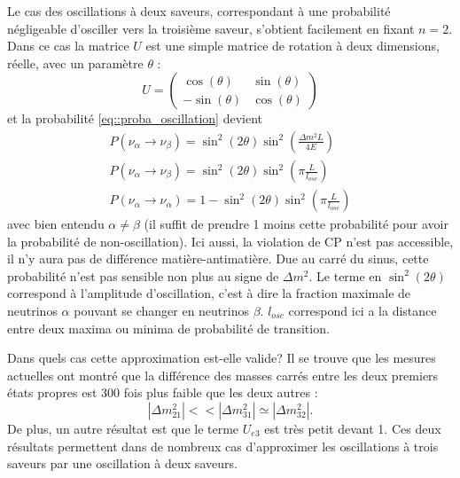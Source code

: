             Le cas des oscillations à deux saveurs, correspondant à une probabilité négligeable d'osciller vers la troisième saveur, s'obtient facilement en fixant $n=2$. Dans ce cas la matrice $U$ est une simple matrice de rotation à deux dimensions, réelle, avec un paramètre $\theta$ :
            \begin{equation}\label{eq::two_flavor_pmns}
                U = \left(\begin{matrix}
                    \cos(\theta) & \sin(\theta) \\
                    -\sin(\theta) & \cos(\theta)
                \end{matrix}\right)
            \end{equation}
            et la probabilité \eqref{eq::proba_oscillation} devient
            \begin{eqnarray}
                \label{eq::two_flavors}
                P(\nu_{\alpha}\to\nu_{\beta}) = \sin^2(2\theta)\sin^2\left(\frac{\Delta m^2 L}{4E}\right) \\ 
                \label{eq::two_flavors_length}
                P(\nu_{\alpha}\to\nu_{\beta}) = \sin^2(2\theta)\sin^2\left(\pi\frac{L}{l_{osc}}\right) \\
                \label{eq::two_flavors_survival}
                P(\nu_{\alpha}\to\nu_{\alpha}) = 1- \sin^2(2\theta)\sin^2\left(\pi\frac{L}{l_{osc}}\right)
            \end{eqnarray}
            avec bien entendu $\alpha\ne \beta$ (il suffit de prendre 1 moins cette probabilité pour avoir la probabilité de non-oscillation). Ici aussi, la violation de CP n'est pas accessible, il n'y aura pas de différence matière-antimatière. Due au carré du sinus, cette probabilité n'est pas sensible non plus au signe de $\Delta m^2$. Le terme en $\sin^2(2\theta)$ correspond à l'amplitude d'oscillation, c'est à dire la fraction maximale de neutrinos $\alpha$ pouvant se changer en neutrinos $\beta$. $l_{osc}$ correspond ici a la distance entre deux maxima ou minima de probabilité de transition.
            
            Dans quels cas cette approximation est-elle valide? Il se trouve que les mesures actuelles ont montré que la différence des masses carrés entre les deux premiers états propres est 300 fois plus faible que les deux autres : 
            \begin{equation}
                |\Delta m^2_{21}| << |\Delta m^2_{31}| \simeq |\Delta m^2_{32}|.
            \end{equation}
            De plus, un autre résultat est que le terme $U_{e3}$ est très petit devant 1. Ces deux résultats permettent dans de nombreux cas d'approximer les oscillations à trois saveurs par une oscillation à deux saveurs.
            
